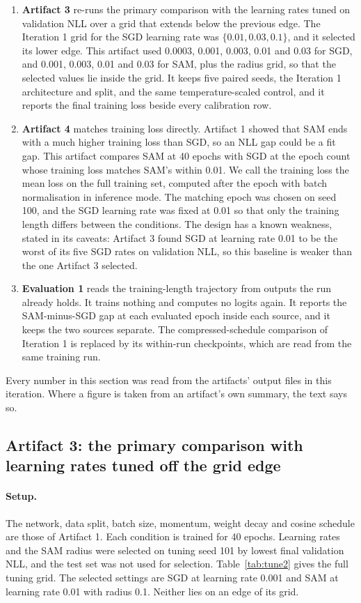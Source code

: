 \documentclass[11pt,letterpaper]{article}
\begin{document}
\begin{enumerate}
\item \textbf{Artifact 3} re-runs the primary comparison with the learning rates tuned on validation NLL over a grid that extends below the previous edge. The Iteration 1 grid for the SGD learning rate was $\{0.01, 0.03, 0.1\}$, and it selected its lower edge. This artifact used 0.0003, 0.001, 0.003, 0.01 and 0.03 for SGD, and 0.001, 0.003, 0.01 and 0.03 for SAM, plus the radius grid, so that the selected values lie inside the grid. It keeps five paired seeds, the Iteration 1 architecture and split, and the same temperature-scaled control, and it reports the final training loss beside every calibration row.
\item \textbf{Artifact 4} matches training loss directly. Artifact 1 showed that SAM ends with a much higher training loss than SGD, so an NLL gap could be a fit gap. This artifact compares SAM at 40 epochs with SGD at the epoch count whose training loss matches SAM's within 0.01. We call the training loss the mean loss on the full training set, computed after the epoch with batch normalisation in inference mode. The matching epoch was chosen on seed 100, and the SGD learning rate was fixed at 0.01 so that only the training length differs between the conditions. The design has a known weakness, stated in its caveats: Artifact 3 found SGD at learning rate 0.01 to be the worst of its five SGD rates on validation NLL, so this baseline is weaker than the one Artifact 3 selected.
\item \textbf{Evaluation 1} reads the training-length trajectory from outputs the run already holds. It trains nothing and computes no logits again. It reports the SAM-minus-SGD gap at each evaluated epoch inside each source, and it keeps the two sources separate. The compressed-schedule comparison of Iteration 1 is replaced by its within-run checkpoints, which are read from the same training run.
\end{enumerate}

Every number in this section was read from the artifacts' output files in this iteration. Where a figure is taken from an artifact's own summary, the text says so.

\subsection{Artifact 3: the primary comparison with learning rates tuned off the grid edge}

\paragraph{Setup.} The network, data split, batch size, momentum, weight decay and cosine schedule are those of Artifact 1. Each condition is trained for 40 epochs. Learning rates and the SAM radius were selected on tuning seed 101 by lowest final validation NLL, and the test set was not used for selection. Table~\ref{tab:tune2} gives the full tuning grid. The selected settings are SGD at learning rate 0.001 and SAM at learning rate 0.01 with radius 0.1. Neither lies on an edge of its grid.
\end{document}

